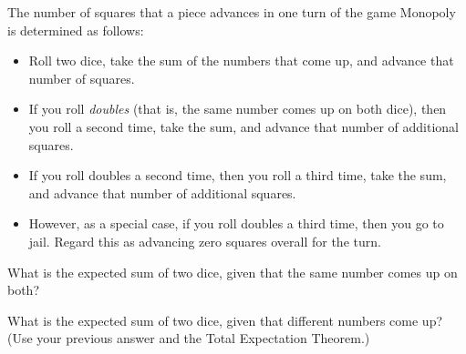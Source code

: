 \documentclass[12pt]{article}
\begin{document}

\newpage

\begin{problem}{}
The number of squares that a piece advances in one turn of the game
Monopoly is determined as follows:

\begin{itemize}

\item Roll two dice, take the sum of the numbers that come up, and
advance that number of squares.

\item If you roll {\em doubles} (that is, the same number comes up on
both dice), then you roll a second time, take the sum, and advance
that number of additional squares.

\item If you roll doubles a second time, then you roll a third time,
take the sum, and advance that number of additional squares.

\item However, as a special case, if you roll doubles a third time,
then you go to jail.  Regard this as advancing zero squares overall
for the turn.

\end{itemize}

\end{problem}

\bparts

\ppart{} What is the expected sum of two dice, given that the same
number comes up on both?


\ppart{} What is the expected sum of two dice, given that different
numbers come up?  (Use your previous answer and the Total Expectation
Theorem.)

\end{document}
